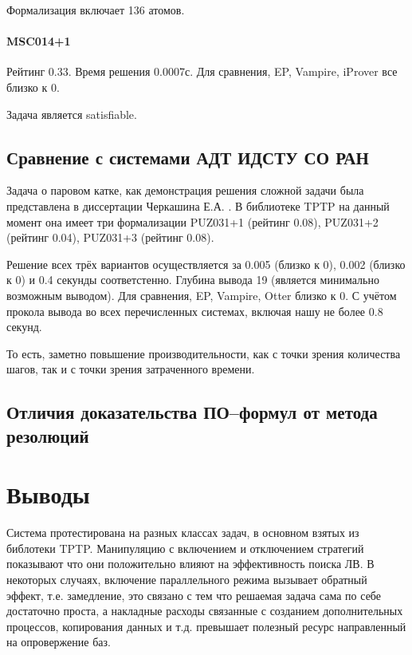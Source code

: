 Формализация включает 136 атомов.



\paragraph{MSC014+1}
Рейтинг 0.33. Время решения 0.0007с. Для сравнения, EP, Vampire, iProver все близко к 0.

Задача является satisfiable.

\subsection{Сравнение с системами АДТ ИДСТУ СО РАН}
Задача о паровом катке, как демонстрация решения сложной задачи была представлена в диссертации Черкашина Е.А. \cite{dissChe}.
В библиотеке TPTP на данный момент она имеет три формализации PUZ031+1 (рейтинг 0.08), PUZ031+2 (рейтинг 0.04), PUZ031+3 (рейтинг 0.08).

Решение всех трёх вариантов осуществляется за 0.005 (близко к 0), 0.002 (близко к 0) и 0.4 секунды соответстенно. Глубина вывода 19 (является минимально возможным выводом). Для сравнения, EP, Vampire, Otter близко к 0. С учётом прокола вывода во всех перечисленных системах, включая нашу не более 0.8 секунд.

То есть, заметно повышение производительности, как с точки зрения количества шагов, так и с точки зрения затраченного времени.


\subsection{Отличия доказательства ПО--формул от метода резолюций}


\section{Выводы}
Система протестирована на разных классах задач, в основном взятых из библотеки TPTP. Манипуляцию с включением и отключением стратегий показывают что они положительно влияют на эффективность поиска ЛВ. В некоторых случаях, включение параллельного режима вызывает обратный эффект, т.е. замедление, это связано с тем что решаемая задача сама по себе достаточно проста, а  накладные расходы связанные с созданием дополнительных процессов, копирования данных и т.д. превышает полезный ресурс направленный на опровержение баз.

